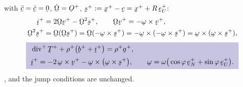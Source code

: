 \begin{solution}
 with $\ddot\bc=\dot\bc=\bze$, $\dot\bOm=\Ob^{+}$,
$\bs^{+}:=\bx^{+}-\bc=\bx^{+}+R\,\be^{+}_{U}$:
\begin{align*}
   \vek{i}^{+}&=2\bOm\bv^{+}-\bOm^{2}\bs^{+},\qquad
   \bOm\bv^{+}=-\bom\times\bv^{+},\\
   \bOm^{2}\bs^{+}&=\bOm(\bOm\bs^{+})=\bOm(-\bom\times\bs^{+})
   =-\bom\times(-\bom\times\bs^{+})=\bom\times(\bom\times\bs^{+}),
\end{align*}
\begin{equation*}
   \boxed{\
   \begin{aligned}
      &\dvg^{+}\bT^{+}+\rho^{+}\big(\bb^{+}+\vek{i}^{+}\big)
        =\rho^{+}\ba^{+},\\[0.6mm]
      &\vek{i}^{+}=-2\,\bom\times\bv^{+}
        -\bom\times\big(\bom\times\bs^{+}\big),
      \qquad
      \bom=\omega\big(\cos\varphi\,\be^{+}_{N}+\sin\varphi\,\be^{+}_{U}\big).
   \end{aligned}
   \ }
\end{equation*}
,  and the jump conditions are unchanged.


\end{solution}
